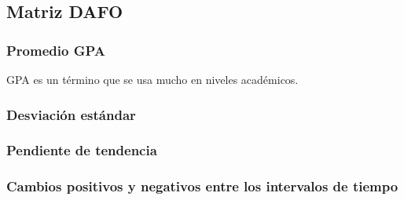 \subsection{Matriz DAFO}
\subsubsection{Promedio GPA}
GPA es un término que se usa mucho en niveles académicos.

\subsubsection{Desviación estándar}

\subsubsection{Pendiente de tendencia}

\subsubsection{Cambios positivos y negativos entre los intervalos de tiempo}
